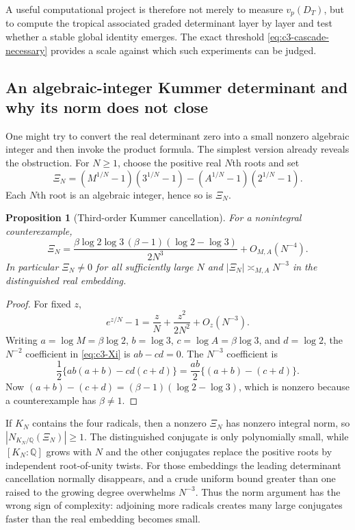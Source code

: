 \documentclass[11pt,oneside]{article}
\newtheorem{proposition}[theorem]{Proposition}
\theoremstyle{definition}
\theoremstyle{remark}
\newcommand{\Q}{\mathbb Q}
\begin{document}
A useful computational project is therefore not merely to measure $v_p(D_T)$, but to compute
the tropical associated graded determinant layer by layer and test whether a stable global
identity emerges.  The exact threshold \eqref{eq:c3-cascade-necessary} provides a scale against
which such experiments can be judged.

\subsection{An algebraic-integer Kummer determinant and why its norm does not close}
\label{sec:c3-kummer}

One might try to convert the real determinant zero into a small nonzero algebraic integer and
then invoke the product formula.  The simplest version already reveals the obstruction.
For $N\ge1$, choose the positive real $N$th roots and set
\begin{equation}\label{eq:c3-Xi}
 \Xi_N=
 (M^{1/N}-1)(3^{1/N}-1)
 -(A^{1/N}-1)(2^{1/N}-1).
\end{equation}
Each $N$th root is an algebraic integer, hence so is $\Xi_N$.

\begin{proposition}[Third-order Kummer cancellation]
\label{prop:c3-kummer-asymptotic}
For a nonintegral counterexample,
\begin{equation}\label{eq:c3-Xi-asymptotic}
 \Xi_N=
 \frac{\beta\log2\log3\,(\beta-1)(\log2-\log3)}{2N^3}
 +O_{M,A}(N^{-4}).
\end{equation}
In particular $\Xi_N\ne0$ for all sufficiently large $N$ and
$|\Xi_N|\asymp_{M,A}N^{-3}$ in the distinguished real embedding.
\end{proposition}

\begin{proof}
For fixed $z$,
\[
 e^{z/N}-1=\frac zN+\frac{z^2}{2N^2}+O_z(N^{-3}).
\]
Writing $a=\log M=\beta\log2$, $b=\log3$, $c=\log A=\beta\log3$, and $d=\log2$, the
$N^{-2}$ coefficient in \eqref{eq:c3-Xi} is $ab-cd=0$.  The $N^{-3}$ coefficient is
\[
 \frac12\{ab(a+b)-cd(c+d)\}
 =\frac{ab}{2}\{(a+b)-(c+d)\}.
\]
Now
$(a+b)-(c+d)=(\beta-1)(\log2-\log3)$, which is nonzero because a counterexample has
$\beta\ne1$.
\end{proof}

If $K_N$ contains the four radicals, then a nonzero $\Xi_N$ has nonzero integral norm, so
$|N_{K_N/\Q}(\Xi_N)|\ge1$.  The distinguished conjugate is only polynomially small, while
$[K_N:\Q]$ grows with $N$ and the other conjugates replace the positive roots by independent
root-of-unity twists.  For those embeddings the leading determinant cancellation normally
disappears, and a crude uniform bound greater than one raised to the growing degree overwhelms
$N^{-3}$.  Thus the norm argument has the wrong sign of complexity: adjoining more radicals
creates many large conjugates faster than the real embedding becomes small.
\end{document}
